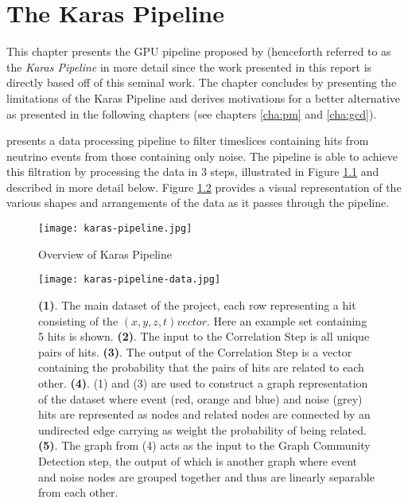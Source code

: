 \chapter{The Karas Pipeline}
\label{cha:karas-pipeline}

This chapter presents the GPU pipeline proposed by
\cite{karas2019data} (henceforth referred to as the \textit{Karas
  Pipeline} in more detail since the work presented in this report is
directly based off of this seminal work. The chapter concludes by
presenting the limitations of the Karas Pipeline and derives
motivations for a better alternative as presented in the following
chapters (see chapters \ref{cha:pm} and \ref{cha:gcd}).

\citeauthor{karas2019data} presents a data processing pipeline to
filter timeslices containing hits from neutrino events from those
containing only noise. The pipeline is able to achieve this filtration
by processing the data in 3 steps, illustrated in Figure
\ref{fig:karas-pipeline} and described in more detail below. Figure
\ref{fig:karas-pipeline-data} provides a visual representation of the
various shapes and arrangements of the data as it passes through the
pipeline.

\begin{figure}[h]
  \centering
  \texttt{[image: karas-pipeline.jpg]}
  \caption{Overview of Karas Pipeline}
  \label{fig:karas-pipeline}
\end{figure}

\begin{figure}[h]
  \centering
  \texttt{[image: karas-pipeline-data.jpg]}
  \caption{\textbf{(1)}. The main dataset of the project, each row
    representing a hit consisting of the $(x, y, z, t) vector$. Here
    an example set containing 5 hits is shown. \textbf{(2)}. The input
    to the Correlation Step is all unique pairs of hits. \textbf{(3)}.
    The output of the Correlation Step is a vector containing the
    probability that the pairs of hits are related to each other.
    \textbf{(4)}. (1) and (3) are used to construct a graph
    representation of the dataset where event (red, orange and blue)
    and noise (grey) hits are represented as nodes and related nodes
    are connected by an undirected edge carrying as weight the
    probability of being related. \textbf{(5)}. The graph from (4)
    acts as the input to the Graph Community Detection step, the
    output of which is another graph where event and noise nodes are
    grouped together and thus are linearly separable from each other.}
  \label{fig:karas-pipeline-data}
\end{figure}

